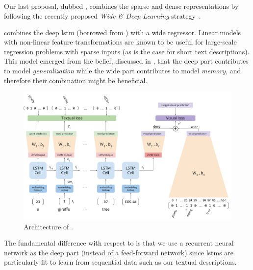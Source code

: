 \subsection{\widedeepttv{}}
\label{subsec:t2v:wd-ttv}

Our last proposal, dubbed \widedeepttv{}, combines the sparse and dense representations by following the recently proposed \emph{Wide \& Deep Learning} strategy~\cite{cheng2016wide}.

\widedeepttv{} combines the deep \gls{lstm} (borrowed from \densettv{}) with a wide regressor.
Linear models with non-linear feature transformations are known to be useful for large-scale regression problems with sparse inputs (as is the case for short text descriptions).
This model emerged from the belief, discussed in \cite{cheng2016wide}, that the deep part contributes to model \emph{generalization} while the wide part contributes to model \emph{memory}, and therefore their combination might be beneficial.

\begin{figure}
\includegraphics[width=\linewidth]{wd-t2v-arch}
\caption{Architecture of \widedeepttv{}.}
\label{fig:t2v:widendeep}
\end{figure}

The fundamental difference with respect to \cite{cheng2016wide} is that we use a recurrent neural network as the deep part (instead of a feed-forward network) since \glspl{lstm} are particularly fit to learn from sequential data such as our textual descriptions.

